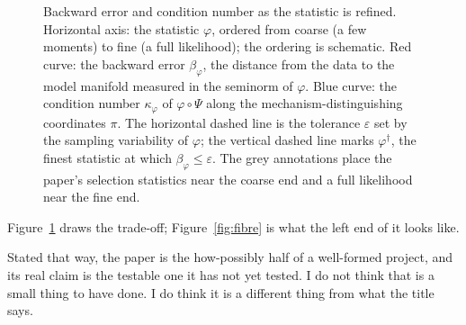 \documentclass[11pt]{article}
\theoremstyle{definition}\newtheorem{observation}{Observation}
\theoremstyle{remark}\newtheorem{remark}{Remark}
\begin{document}
\begin{figure}[htbp]\centering
{}
\caption{Backward error and condition number as the statistic is refined. Horizontal axis: the statistic $\varphi$, ordered from coarse (a few moments) to fine (a full likelihood); the ordering is schematic. Red curve: the backward error $\beta_\varphi$, the distance from the data to the model manifold measured in the seminorm of $\varphi$. Blue curve: the condition number $\kappa_\varphi$ of $\varphi\circ\Psi$ along the mechanism-distinguishing coordinates $\pi$. The horizontal dashed line is the tolerance $\varepsilon$ set by the sampling variability of $\varphi$; the vertical dashed line marks $\varphi^{\dagger}$, the finest statistic at which $\beta_\varphi\le\varepsilon$. The grey annotations place the paper's selection statistics near the coarse end and a full likelihood near the fine end.}
\label{fig:eq}
\end{figure}

Figure~\ref{fig:eq} draws the trade-off; Figure~\ref{fig:fibre} is what the left end of it looks like.

Stated that way, the paper is the how-possibly half of a well-formed project, and its real claim is the testable one it has not yet tested. I do not think that is a small thing to have done. I do think it is a different thing from what the title says.
\end{document}
